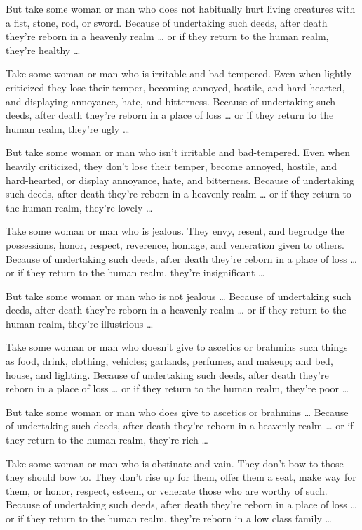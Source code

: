\documentclass[12pt,openany]{book}%
\begin{document}
But take some woman or man who does not habitually hurt living creatures with a fist, stone, rod, or sword. Because of undertaking such deeds, after death they’re reborn in a heavenly realm … or if they return to the human realm, they’re healthy … 

Take some woman or man who is irritable and bad-tempered. Even when lightly criticized they lose their temper, becoming annoyed, hostile, and hard-hearted, and displaying annoyance, hate, and bitterness. Because of undertaking such deeds, after death they’re reborn in a place of loss … or if they return to the human realm, they’re ugly … 

But take some woman or man who isn’t irritable and bad-tempered. Even when heavily criticized, they don’t lose their temper, become annoyed, hostile, and hard-hearted, or display annoyance, hate, and bitterness. Because of undertaking such deeds, after death they’re reborn in a heavenly realm … or if they return to the human realm, they’re lovely … 

Take some woman or man who is jealous. They envy, resent, and begrudge the possessions, honor, respect, reverence, homage, and veneration given to others. Because of undertaking such deeds, after death they’re reborn in a place of loss … or if they return to the human realm, they’re insignificant … 

But take some woman or man who is not jealous … Because of undertaking such deeds, after death they’re reborn in a heavenly realm … or if they return to the human realm, they’re illustrious … 

Take some woman or man who doesn’t give to ascetics or brahmins such things as food, drink, clothing, vehicles; garlands, perfumes, and makeup; and bed, house, and lighting. Because of undertaking such deeds, after death they’re reborn in a place of loss … or if they return to the human realm, they’re poor … 

But take some woman or man who does give to ascetics or brahmins … Because of undertaking such deeds, after death they’re reborn in a heavenly realm … or if they return to the human realm, they’re rich … 

Take some woman or man who is obstinate and vain. They don’t bow to those they should bow to. They don’t rise up for them, offer them a seat, make way for them, or honor, respect, esteem, or venerate those who are worthy of such. Because of undertaking such deeds, after death they’re reborn in a place of loss … or if they return to the human realm, they’re reborn in a low class family … 
\end{document}
